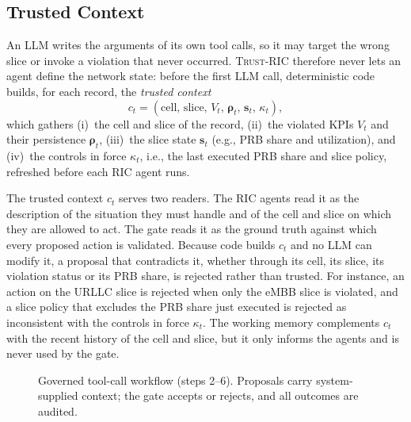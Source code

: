 \documentclass[conference]{IEEEtran}
\newcommand{\fw}{\textsc{Trust-RIC}}
\begin{document}
\subsection{Trusted Context}\label{sec:ctx}
An LLM writes the arguments of its own tool calls, so it may target the wrong slice or invoke a violation that never occurred. \fw{} therefore never lets an agent define the network state: before the first LLM call, deterministic code builds, for each record, the \emph{trusted context}
\begin{equation}
c_t=(\text{cell},\,\text{slice},\,V_t,\,\boldsymbol{\rho}_t,\,\mathbf{s}_t,\,\kappa_t),
\end{equation}
which gathers (i)~the cell and slice of the record, (ii)~the violated KPIs $V_t$ and their persistence $\boldsymbol{\rho}_t$, (iii)~the slice state $\mathbf{s}_t$ (e.g., PRB share and utilization), and (iv)~the controls in force $\kappa_t$, i.e., the last executed PRB share and slice policy, refreshed before each RIC agent runs.

\noindent The trusted context $c_t$ serves two readers. The RIC agents read it as the description of the situation they must handle and of the cell and slice on which they are allowed to act. The gate reads it as the ground truth against which every proposed action is validated. Because code builds $c_t$ and no LLM can modify it, a proposal that contradicts it, whether through its cell, its
slice, its violation status or its PRB share, is rejected rather than trusted. For instance, an action on the URLLC slice is rejected when only the eMBB slice is violated, and a slice policy that excludes the PRB share just executed is rejected as inconsistent with the controls in force $\kappa_t$. The working memory complements $c_t$ with the recent history of the cell and slice, but it only informs the agents and is never used by the gate.
\begin{figure}[!t]
\centering
\resizebox{0.7\columnwidth}{!}{}
\caption{Governed tool-call workflow (steps 2--6). Proposals carry system-supplied context; the gate accepts or rejects, and all outcomes are audited.}
\label{fig:wf}
\end{figure}
\end{document}
